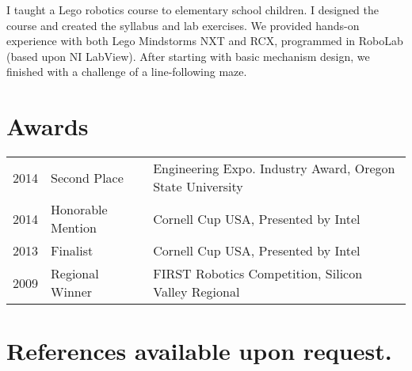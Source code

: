 \documentclass[letterpaper]{deedy-resume} %
\begin{document}
\begin{minipage}[t]{0.66\textwidth}
\sectionspace %



I taught a Lego robotics course to elementary school children. I designed the course and created the syllabus and lab exercises. We provided hands-on experience with both Lego Mindstorms NXT and RCX, programmed in RoboLab (based upon NI LabView). After starting with basic mechanism design, we finished with a challenge of a line-following maze.

\sectionspace %


\section{Awards} 

\begin{tabular}{rll}
2014	 & Second Place & Engineering Expo. Industry Award, Oregon State University\\
2014	 & Honorable Mention & Cornell Cup USA, Presented by Intel\\
2013	 & Finalist & Cornell Cup USA, Presented by Intel\\
2009	 & Regional Winner & FIRST Robotics Competition, Silicon Valley Regional\\
\end{tabular}

\sectionspace %

\section{References available upon request.}

\end{minipage} %



\end{document}
